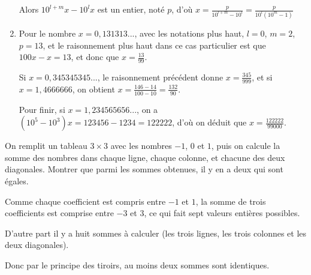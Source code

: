 \begin{exo}
\begin{sol}
\begin{enumerate}
Alors $10^{l+m}x - 10^lx$ est un entier, noté $p$, d'où $x = \frac{p}{10^{l+m} - 10^l} = \frac{p}{10^l(10^m-1)}$
\item Pour le nombre $x=0,131313...$, avec les notations plus haut, $l=0$, $m=2$, $p=13$, et le raisonnement plus haut dans ce cas particulier est que $100x-x=13$, et donc que $x=\frac{13}{99}$.

Si $x=0,345345345...$, le raisonnement précédent donne $x=\frac{345}{999}$, et si $x=1,4666666$, on obtient $x=\frac{146-14}{100-10}=\frac{132}{90}$.

Pour finir, si $x=1,234565656...$, on a $(10^5-10^3)x=123456-1234=122222$, d'où on déduit que $x=\frac{122222}{99000}$.
\end{enumerate}
\end{sol}
\end{exo}


\begin{exo}
On remplit un tableau $3\times 3$  avec les nombres $-1$, $0$ et $1$, puis on calcule la somme des nombres dans chaque ligne, chaque colonne, et chacune des deux diagonales. Montrer que parmi les sommes obtenues, il y en a deux qui sont égales.
\begin{sol}
Comme chaque coefficient est compris entre $-1$ et $1$, la somme de trois coefficients est comprise entre $-3$ et $3$, ce qui fait sept valeurs entières possibles.

D'autre part il y a huit sommes à calculer (les trois lignes, les trois colonnes et les deux diagonales).

Donc par le principe des tiroirs, au moins deux sommes sont identiques.
\end{sol}
\end{exo}



